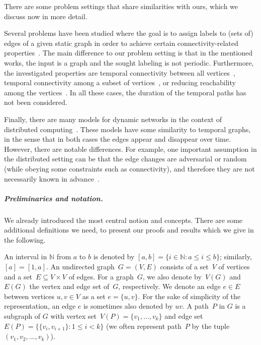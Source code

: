 \documentclass[a4paper,UKenglish,cleveref, autoref, thm-restate]{lipics-v2021}
\begin{document}
There are some problem settings that share similarities with ours, which we discuss now in more detail.

Several problems have been studied where the goal is to assign labels to (sets of) edges of a given static graph in order to achieve certain connectivity-related properties~\cite{KlobasMMS22,MertziosMS19,akrida2017complexity,enright2021assigning}. The main difference to our problem setting is that in the mentioned works, the input is a graph and the sought labeling is not periodic. Furthermore, the investigated properties are temporal connectivity between all vertices~\cite{KlobasMMS22,MertziosMS19,akrida2017complexity}, temporal connectivity among a subset of vertices~\cite{KlobasMMS22}, or reducing reachability among the vertices~\cite{enright2021assigning}. In all these cases, the duration of the temporal paths has not been considered.




Finally, there are many models for dynamic networks in the context of distributed computing~\cite{Kuhn2011Dynamic}. 
These models have some similarity to temporal graphs, in the sense that in both cases the edges appear and disappear over time. 
However, there are notable differences. For example, one important assumption in the distributed setting 
can be that the edge changes are adversarial or random (while obeying some constraints such as connectivity), 
and therefore they are not necessarily known in advance~\cite{Kuhn2011Dynamic}. 




\subparagraph{Preliminaries and notation.}
We already introduced the most central notion and concepts. There are some additional definitions we need, to present our proofs and results which we give in the following. 

An interval in $\mathbb N$ from $a$ to $b$ is denoted by $[a,b] = \{ i\in \mathbb N  :  a \leq i \leq b\}$; similarly, $[a] = [1,a]$.
An undirected graph~$G=(V,E)$ consists of a set~$V$ of vertices 
and a set~$E \subseteq V \times V$ of edges.
For a graph~$G$, we also denote by~$V(G)$ and~$E(G)$ the vertex and edge set of~$G$, respectively.
We denote an edge $e \in E$ between vertices $u,v \in V$ as a set $e=\{u,v\}$.
For the sake of simplicity of the representation, an edge $e$ is sometimes also denoted by $uv$. 
A path~$P$ in $G$ is a subgraph of $G$ with vertex set~$V(P)=\{v_1,\dots,v_k\}$ and edge set~$E(P)=\{\{v_i,v_{i+1}\} :  1\leq i<k\}$
(we often represent path~$P$ by the tuple~$(v_1,v_2,\dots,v_k)$).
\end{document}
